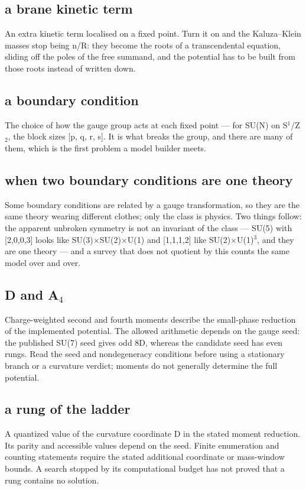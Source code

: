 \documentclass[11pt,a4paper]{article}
\begin{document}
\subsection*{a brane kinetic term}
An extra kinetic term localised on a fixed point. Turn it on and the Kaluza--Klein masses stop being n/R: they become the roots of a transcendental equation, sliding off the poles of the free summand, and the potential has to be built from those roots instead of written down.

\subsection*{a boundary condition}
The choice of how the gauge group acts at each fixed point --- for SU(N) on S\ensuremath{{}^{1}}/Z\ensuremath{{}_{2}}, the block sizes [p, q, r, s]. It is what breaks the group, and there are many of them, which is the first problem a model builder meets.

\subsection*{when two boundary conditions are one theory}
Some boundary conditions are related by a gauge transformation, so they are the same theory wearing different clothes; only the class is physics. Two things follow: the apparent unbroken symmetry is not an invariant of the class --- SU(5) with [2,0,0,3] looks like SU(3)\ensuremath{\times}SU(2)\ensuremath{\times}U(1) and [1,1,1,2] like SU(2)\ensuremath{\times}U(1)\ensuremath{{}^{3}}, and they are one theory --- and a survey that does not quotient by this counts the same model over and over.

\subsection*{D and A\ensuremath{{}_{4}}}
Charge-weighted second and fourth moments describe the small-phase reduction of the implemented potential. The allowed arithmetic depends on the gauge seed: the published SU(7) seed gives odd 8D, whereas the candidate seed has even rungs. Read the seed and nondegeneracy conditions before using a stationary branch or a curvature verdict; moments do not generally determine the full potential.

\subsection*{a rung of the ladder}
A quantized value of the curvature coordinate D in the stated moment reduction. Its parity and accessible values depend on the seed. Finite enumeration and counting statements require the stated additional coordinate or mass-window bounds. A search stopped by its computational budget has not proved that a rung contains no solution.
\end{document}
